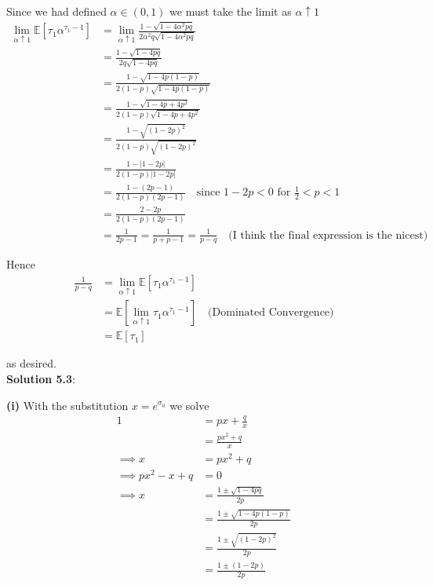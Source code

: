 \documentclass[12pt]{article}
\newcommand{\E}{\mathbb E}
\begin{document}
Since we had defined $\alpha \in (0,1)$ we must take the limit as $\alpha \uparrow 1$
\begin{align*}
	\lim_{\alpha \uparrow 1} \E \left[ \tau_1 \alpha^{\tau_1 - 1} \right] &= \lim_{\alpha \uparrow 1} \frac{ 1 - \sqrt{1 - 4\alpha^2 pq} }{ 2\alpha^2 q \sqrt{1 - 4\alpha^2 pq} } \\
	&= \frac{ 1 - \sqrt{1 - 4 pq} }{ 2 q \sqrt{1 - 4 pq} } \\
	&= \frac{ 1 - \sqrt{1 - 4 p ( 1 - p ) } }{ 2 (1 - p) \sqrt{1 - 4 p (1 - p)} } \\
	&= \frac{ 1 - \sqrt{ 1 - 4p + 4p^2 }}{ 2 (1 - p) \sqrt{ 1 - 4p + 4p^2 } } \\
	&= \frac{ 1 - \sqrt{(1 - 2p)^2} }{ 2(1 - p) \sqrt{ (1 - 2p)^2 } } \\
	&= \frac{1 - |1 - 2p| }{ 2(1 - p)|1 - 2p| } \\
	&= \frac{1 - (2p - 1) }{ 2(1 - p)(2p - 1) } \quad \text{since } 1 - 2p < 0 \text{ for $\frac{1}{2} < p < 1$} \\
	&= \frac{ 2 - 2p }{ 2(1 - p)(2p - 1) } \\
	&= \frac{1}{2p - 1} = \frac{1}{p + p - 1} = \frac{1}{p - q} \quad \text{(I think the final expression is the nicest)}
\end{align*}

Hence
\begin{align*}
	\frac{1}{p - q} &= \lim_{\alpha \uparrow 1} \E \left[ \tau_1 \alpha^{\tau_1 - 1} \right] \\
	&= \E \left[ \lim_{\alpha \uparrow 1} \tau_1 \alpha^{\tau_1 - 1} \right] \quad \text{(Dominated Convergence)} \\
	&= \E \left[ \tau_1  \right]
\end{align*}

as desired. \\

\newpage
{\bf Solution 5.3}: 

{\bf (i)} With the substitution $x = e^{\sigma_0}$ we solve
\begin{align*}
	1 &= px + \frac{q}{x} \\
	&= \frac{px^2 + q}{x} \\
	\implies x &= px^2 + q \\
	\implies px^2 - x + q &= 0 \\
	\implies x &= \frac{ 1 \pm \sqrt{1 - 4pq} }{ 2p } \\
	&= \frac{ 1 \pm \sqrt{1 - 4p(1 - p) }}{ 2p } \\
	&= \frac{ 1 \pm \sqrt{(1 - 2p)^2} }{ 2p } \\
	&= \frac{ 1 \pm (1 - 2p) }{ 2p }
\end{align*}
\end{document}
